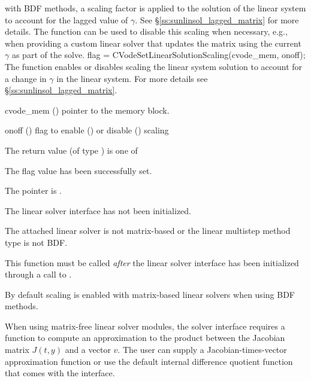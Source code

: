 with BDF methods, a scaling factor is applied to the solution of the linear
system to account for the lagged value of $\gamma$. See
\S\ref{ss:sunlinsol_lagged_matrix} for more details. The function
 can be used to disable this scaling when
necessary, e.g., when providing a custom linear solver that updates the matrix
using the current $\gamma$ as part of the solve.
{
  flag = CVodeSetLinearSolutionScaling(cvode\_mem, onoff);
}
{
  The function  enables or disables scaling
  the linear system solution to account for a change in $\gamma$ in the linear
  system. For more details see \S\ref{ss:sunlinsol_lagged_matrix}.
}
{
  \begin{args}
  \item[cvode\_mem] ()
    pointer to the {\cvode} memory block.
  \item[onoff] ()
    flag to enable () or disable () scaling
  \end{args}
}
{
  The return value  (of type ) is one of
  \begin{args}
  \item[\Id{CVLS\_SUCCESS}]
    The flag value has been successfully set.
  \item[\Id{CVLS\_MEM\_NULL}]
    The  pointer is .
  \item[\Id{CVLS\_LMEM\_NULL}]
    The {\cvls} linear solver interface has not been initialized.
  \item[\Id{CVLS\_ILL\_INPUT}]
    The attached linear solver is not matrix-based or the linear multistep
    method type is not BDF.
  \end{args}
}
{
  This function must be called \emph{after} the {\cvls} linear solver
  interface has been initialized through a call to
  .

  By default scaling is enabled with matrix-based linear solvers when using BDF
  methods.
}
When using matrix-free linear solver modules, the {\cvls} solver
interface requires a function to compute an approximation to the
product between the Jacobian matrix $J(t,y)$ and a vector $v$. The
user can supply a Jacobian-times-vector approximation function or use
the default internal difference quotient function
that comes with the {\cvls} interface.

